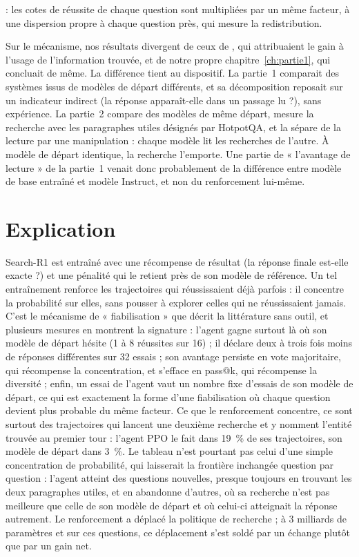 \citep{matrenok2026controlling} : les cotes de réussite de chaque question sont multipliées par un même facteur, à une dispersion propre à chaque question près, qui mesure la redistribution.

Sur le mécanisme, nos résultats divergent de ceux de \citet{zhai2026does}, qui attribuaient le gain à l'usage de l'information trouvée, et de notre propre chapitre~\ref{ch:partie1}, qui concluait de même. La différence tient au dispositif. La partie~1 comparait des systèmes issus de modèles de départ différents, et sa décomposition reposait sur un indicateur indirect (la réponse apparaît-elle dans un passage lu ?), sans expérience. La partie~2 compare des modèles de même départ, mesure la recherche avec les paragraphes utiles désignés par HotpotQA, et la sépare de la lecture par une manipulation : chaque modèle lit les recherches de l'autre. À modèle de départ identique, la recherche l'emporte. Une partie de « l'avantage de lecture » de la partie~1 venait donc probablement de la différence entre modèle de base entraîné et modèle Instruct, et non du renforcement lui-même.

\section{Explication}
Search-R1 est entraîné avec une récompense de résultat (la réponse finale est-elle exacte ?) et une pénalité qui le retient près de son modèle de référence. Un tel entraînement renforce les trajectoires qui réussissaient déjà parfois : il concentre la probabilité sur elles, sans pousser à explorer celles qui ne réussissaient jamais. C'est le mécanisme de « fiabilisation » que décrit la littérature sans outil, et plusieurs mesures en montrent la signature : l'agent gagne surtout là où son modèle de départ hésite (1 à 8 réussites sur 16) ; il déclare deux à trois fois moins de réponses différentes sur 32 essais ; son avantage persiste en vote majoritaire, qui récompense la concentration, et s'efface en pass@k, qui récompense la diversité ; enfin, un essai de l'agent vaut un nombre fixe d'essais de son modèle de départ, ce qui est exactement la forme d'une fiabilisation où chaque question devient plus probable du même facteur. Ce que le renforcement concentre, ce sont surtout des trajectoires qui lancent une deuxième recherche et y nomment l'entité trouvée au premier tour : l'agent PPO le fait dans 19~\% de ses trajectoires, son modèle de départ dans 3~\%. Le tableau n'est pourtant pas celui d'une simple concentration de probabilité, qui laisserait la frontière inchangée question par question : l'agent atteint des questions nouvelles, presque toujours en trouvant les deux paragraphes utiles, et en abandonne d'autres, où sa recherche n'est pas meilleure que celle de son modèle de départ et où celui-ci atteignait la réponse autrement. Le renforcement a déplacé la politique de recherche ; à 3 milliards de paramètres et sur ces questions, ce déplacement s'est soldé par un échange plutôt que par un gain net.

